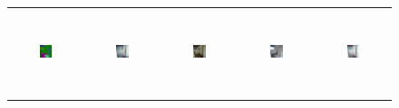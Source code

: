 \begin{figure}[]
\begin{tabular} {cc|cc|c}
\includegraphics[width=0.1932\textwidth,height=0.96in]{Images/Rec/ADE/label/ADE_val_00000090.png} & \includegraphics[width=0.1932\textwidth,height=0.96in]{Images/Rec/ADE/gt/ADE_val_00000090.jpg} &
\includegraphics[width=0.1932\textwidth,height=0.96in]{Images/Rec/ADE/pix2pixhd/ADE_val_00000090.jpg} &   \includegraphics[width=0.1932\textwidth,height=0.96in]{Images/Rec/ADE/spade/ADE_val_00000090.jpg} &  \includegraphics[width=0.1932\textwidth,height=0.96in]{Images/Rec/ADE/ours/ADE_val_00000090.png} \\


\end{tabular}
\end{figure}
